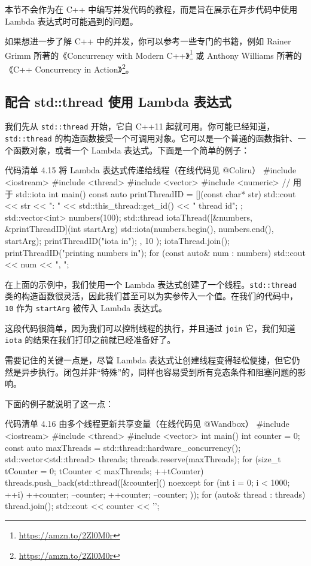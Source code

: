 本节不会作为在 C++ 中编写并发代码的教程，而是旨在展示在异步代码中使用 Lambda 表达式时可能遇到的问题。

如果想进一步了解 C++ 中的并发，你可以参考一些专门的书籍，例如 Rainer Grimm 所著的《Concurrency with Modern C++》\footnote{\url{https://amzn.to/2Zl0M0r}} 或 Anthony Williams 所著的《C++ Concurrency in Action》\footnote{\url{https://amzn.to/2Zl0M0r}}。

\subsection{配合 std::thread 使用 Lambda 表达式}

我们先从 \texttt{std::thread} 开始，它自 C++11 起就可用。你可能已经知道，\texttt{std::thread} 的构造函数接受一个可调用对象。它可以是一个普通的函数指针、一个函数对象，或者一个 Lambda 表达式。下面是一个简单的例子：

\begin{codeboxt}{代码清单 4.15 将 Lambda 表达式传递给线程（在线代码见 @Coliru）}
#include <iostream>
#include <thread>
#include <vector>
#include <numeric> // 用于 std::iota
int main() {
const auto printThreadID = [](const char* str) {
std::cout << str << ": "
<< std::this_thread::get_id() << " thread id\n";
};
std::vector<int> numbers(100);
std::thread iotaThread([&numbers, &printThreadID](int startArg) {
std::iota(numbers.begin(), numbers.end(), startArg);
printThreadID("iota in");
}, 10
);
iotaThread.join();
printThreadID("printing numbers in");
for (const auto& num : numbers)
std::cout << num << ", ";
}
\end{codeboxt}

在上面的示例中，我们使用一个 Lambda 表达式创建了一个线程。\texttt{std::thread} 类的构造函数很灵活，因此我们甚至可以为实参传入一个值。在我们的代码中，\texttt{10} 作为 \texttt{startArg} 被传入 Lambda 表达式。

这段代码很简单，因为我们可以控制线程的执行，并且通过 \texttt{join} 它，我们知道 \texttt{iota} 的结果在我们打印之前就已经准备好了。

需要记住的关键一点是，尽管 Lambda 表达式让创建线程变得轻松便捷，但它仍然是异步执行。闭包并非“特殊”的，同样也容易受到所有竞态条件和阻塞问题的影响。

下面的例子就说明了这一点：

\begin{codeboxt}{代码清单 4.16 由多个线程更新共享变量（在线代码见 @Wandbox）}
#include <iostream>
#include <thread>
#include <vector>
int main() {
int counter = 0;
const auto maxThreads = std::thread::hardware_concurrency();
std::vector<std::thread> threads;
threads.reserve(maxThreads);
for (size_t tCounter = 0; tCounter < maxThreads; ++tCounter) {
threads.push_back(std::thread([&counter]() noexcept {
for (int i = 0; i < 1000; ++i) {
++counter;
--counter;
++counter;
--counter;
}
}));
}
for (auto& thread : threads)
thread.join();
std::cout << counter << '\n';
}
\end{codeboxt}

